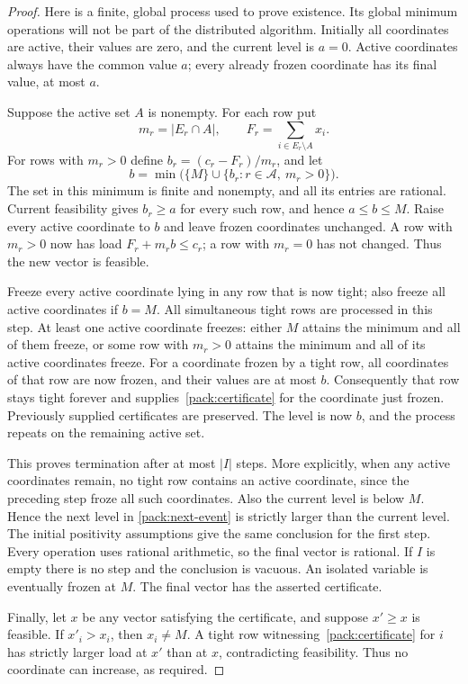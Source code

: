 \documentclass[11pt,a4paper]{article}
\theoremstyle{definition}
\theoremstyle{remark}
\begin{document}
\begin{proof}
Here is a finite, global process used to prove existence.  Its global
minimum operations will not be part of the distributed algorithm.
Initially all coordinates are active, their values are zero, and the
current level is $a=0$.  Active coordinates always have the common value
$a$; every already frozen coordinate has its final value, at most $a$.

Suppose the active set $A$ is nonempty.  For each row put
\[
 m_r=|E_r\cap A|,
 \qquad F_r=\sum_{i\in E_r\setminus A}x_i.
\]
For rows with $m_r>0$ define
$b_r=(c_r-F_r)/m_r$, and let
\begin{equation}\label{pack:next-event}
 b=\min\bigl(\{M\}\cup\{b_r:r\in\mathcal A,\ m_r>0\}\bigr).
\end{equation}
The set in this minimum is finite and nonempty, and all its entries are
rational.  Current feasibility gives $b_r\geq a$ for every such row,
and hence $a\leq b\leq M$.  Raise every active coordinate to $b$ and
leave frozen coordinates unchanged.  A row with $m_r>0$ now has load
$F_r+m_rb\leq c_r$; a row with $m_r=0$ has not changed.  Thus the new
vector is feasible.

Freeze every active coordinate lying in any row that is now tight;
also freeze all active coordinates if $b=M$.  All simultaneous tight
rows are processed in this step.  At least one active coordinate freezes:
either $M$ attains the minimum and all of them freeze, or some row with
$m_r>0$ attains the minimum and all of its active coordinates freeze.
For a coordinate frozen by a tight row, all coordinates of that row are
now frozen, and their values are at most $b$.  Consequently that row
stays tight forever and supplies~\eqref{pack:certificate} for the
coordinate just frozen.  Previously supplied certificates are preserved.
The level is now $b$, and the process repeats on the remaining active set.

This proves termination after at most $|I|$ steps.  More explicitly, when
any active coordinates remain, no tight row contains an active
coordinate, since the preceding step froze all such coordinates.  Also
the current level is below $M$.  Hence the next level in
\eqref{pack:next-event} is strictly larger than the current level.
The initial positivity assumptions give the same conclusion for the
first step.  Every operation uses rational arithmetic, so the final
vector is rational.  If $I$ is empty there is no step and the conclusion
is vacuous.  An isolated variable is eventually frozen at $M$.
The final vector has the asserted certificate.

Finally, let $x$ be any vector satisfying the certificate, and suppose
$x'\geq x$ is feasible.  If $x'_i>x_i$, then $x_i\ne M$.  A tight row
witnessing~\eqref{pack:certificate} for $i$ has strictly larger load at
$x'$ than at $x$, contradicting feasibility.  Thus no coordinate can
increase, as required.
\end{proof}
\end{document}

